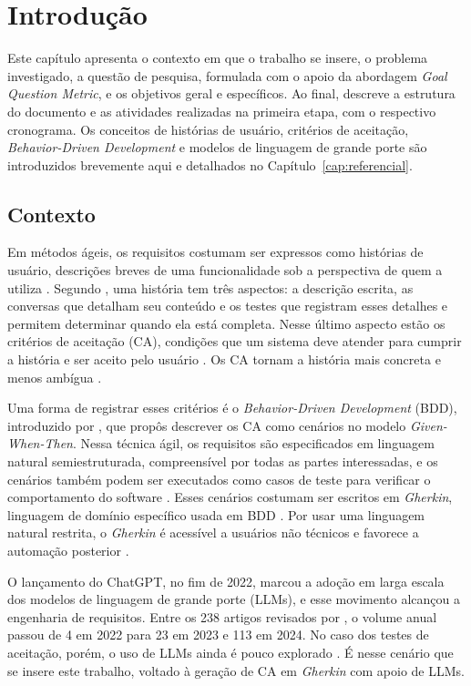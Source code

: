 \chapter[Introdução]{Introdução}
\label{cap:introducao}

Este capítulo apresenta o contexto em que o trabalho se insere, o problema investigado, a questão de pesquisa, formulada com o apoio da abordagem \textit{Goal Question Metric}, e os objetivos geral e específicos. Ao final, descreve a estrutura do documento e as atividades realizadas na primeira etapa, com o respectivo cronograma. Os conceitos de histórias de usuário, critérios de aceitação, \textit{Behavior-Driven Development} e modelos de linguagem de grande porte são introduzidos brevemente aqui e detalhados no Capítulo~\ref{cap:referencial}.

\section{Contexto}
\label{sec:contexto}

Em métodos ágeis, os requisitos costumam ser expressos como histórias de usuário, descrições breves de uma funcionalidade sob a perspectiva de quem a utiliza \cite{zhang2024}. Segundo , uma história tem três aspectos: a descrição escrita, as conversas que detalham seu conteúdo e os testes que registram esses detalhes e permitem determinar quando ela está completa. Nesse último aspecto estão os critérios de aceitação (CA), condições que um sistema deve atender para cumprir a história e ser aceito pelo usuário \cite{wang2025}. Os CA tornam a história mais concreta e menos ambígua \cite{zhang2024}.

Uma forma de registrar esses critérios é o \textit{Behavior-Driven Development} (BDD), introduzido por , que propôs descrever os CA como cenários no modelo \textit{Given-When-Then}. Nessa técnica ágil, os requisitos são especificados em linguagem natural semiestruturada, compreensível por todas as partes interessadas, e os cenários também podem ser executados como casos de teste para verificar o comportamento do software \cite{binamungu2023}. Esses cenários costumam ser escritos em \textit{Gherkin}, linguagem de domínio específico usada em BDD \cite{hassani2026}. Por usar uma linguagem natural restrita, o \textit{Gherkin} é acessível a usuários não técnicos e favorece a automação posterior \cite{ferreira2025}.

O lançamento do ChatGPT, no fim de 2022, marcou a adoção em larga escala dos modelos de linguagem de grande porte (LLMs), e esse movimento alcançou a engenharia de requisitos. Entre os 238 artigos revisados por , o volume anual passou de 4 em 2022 para 23 em 2023 e 113 em 2024. No caso dos testes de aceitação, porém, o uso de LLMs ainda é pouco explorado \cite{ferreira2025}. É nesse cenário que se insere este trabalho, voltado à geração de CA em \textit{Gherkin} com apoio de LLMs.

